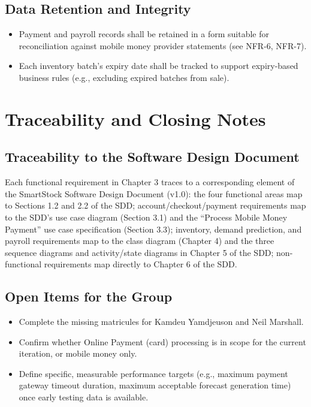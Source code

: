 \documentclass[11pt,a4paper]{report}
\begin{document}
\section{Data Retention and Integrity}
\begin{itemize}[itemsep=2pt]
    \item Payment and payroll records shall be retained in a form suitable for reconciliation against mobile money provider statements (see NFR-6, NFR-7).
    \item Each inventory batch's expiry date shall be tracked to support expiry-based business rules (e.g., excluding expired batches from sale).
\end{itemize}

\chapter{Traceability and Closing Notes}

\section{Traceability to the Software Design Document}
Each functional requirement in Chapter 3 traces to a corresponding element of the SmartStock Software Design Document (v1.0): the four functional areas map to Sections 1.2 and 2.2 of the SDD; account/checkout/payment requirements map to the SDD's use case diagram (Section 3.1) and the ``Process Mobile Money Payment'' use case specification (Section 3.3); inventory, demand prediction, and payroll requirements map to the class diagram (Chapter 4) and the three sequence diagrams and activity/state diagrams in Chapter 5 of the SDD; non-functional requirements map directly to Chapter 6 of the SDD.

\section{Open Items for the Group}
\begin{itemize}[itemsep=2pt]
    \item Complete the missing matricules for Kamdeu Yamdjeuson and Neil Marshall.
    \item Confirm whether Online Payment (card) processing is in scope for the current iteration, or mobile money only.
    \item Define specific, measurable performance targets (e.g., maximum payment gateway timeout duration, maximum acceptable forecast generation time) once early testing data is available.
\end{itemize}
\end{document}
